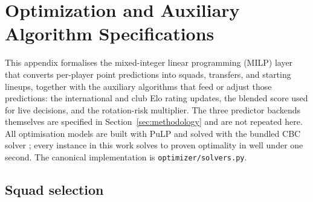 \section{Optimization and Auxiliary Algorithm Specifications}
\label{sec:b}

This appendix formalises the mixed-integer linear programming (MILP)
layer that converts per-player point predictions into squads,
transfers, and starting lineups, together with the auxiliary
algorithms that feed or adjust those predictions: the international
and club Elo rating updates, the blended score used for live
decisions, and the rotation-risk multiplier. The three predictor
backends themselves are specified in Section~\ref{sec:methodology}
and are not repeated here. All optimisation models are built with
PuLP \citep{pulp} and solved with the bundled CBC solver \citep{cbc};
every instance in this work solves to proven optimality in well under
one second. The canonical implementation is
\texttt{optimizer/solvers.py}.

\subsection{Squad selection}
\label{sec:appendix-b-squad}

